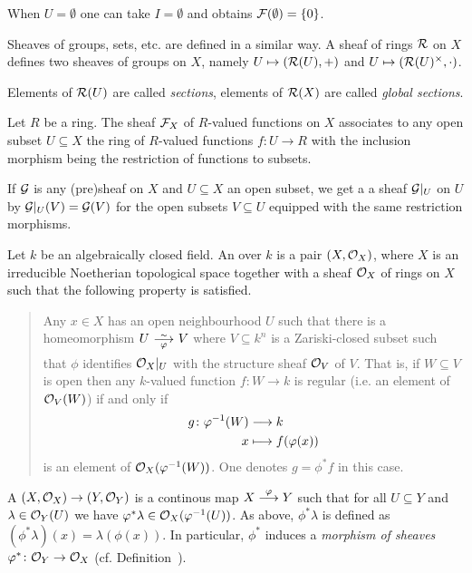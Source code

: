 \documentclass[a4paper,parskip=half,numbers=enddot, DIV=12]{scrreprt}
\begin{document}
\begin{rem}
    When $U=\emptyset$ one can take $I=\emptyset$ and obtains $\mathcal{F}(\emptyset) = \{0\}$.
\end{rem}
\begin{rem}
    Sheaves of groups, sets, etc. are defined in a similar way. A sheaf of rings $\mathcal{R}$ on $X$ defines two sheaves of groups on $X$, namely $U\mapsto (\mathcal{R}(U), +)$ and $U\mapsto (\mathcal{R}(U)^\times, \cdot)$.
\end{rem}
\begin{rem}
    Elements of $\mathcal{R}(U)$ are called \emph{sections}, elements of $\mathcal{R}(X)$ are called \emph{global sections}.
\end{rem}
\begin{example}
	    Let $R$ be a ring. The sheaf $\mathcal{F}_X$ of $R$-valued functions on $X$ associates to any open subset $U\subseteq X$ the ring of $R$-valued functions $f\colon U \to R$ with the inclusion morphism being the restriction of functions to subsets.
\end{example}
\begin{rem*}
	  If $\mathcal{G}$ is any (pre)sheaf on $X$ and $U\subseteq X$ an open subset, we get a a sheaf $\mathcal{G}|_U$ on $U$ by $\mathcal{G}|_U(V) = \mathcal{G}(V)$ for the open subsets $V\subseteq U$ equipped with the same restriction morphisms.
\end{rem*}
\begin{defi} 
	    Let $k$ be an algebraically closed field. An  over $k$ is a pair $(X,\mathcal{O}_X)$, where $X$ is an irreducible Noetherian topological space together with a sheaf $\mathcal{O}_X$ of rings on $X$ such that the following property is satisfied.
	    \begin{quote}
	        Any $x\in X$ has an open neighbourhood $U$ such that there is a homeomorphism $U\isomorphism[\phi] V$ where $V\subseteq k^n$ is a Zariski-closed subset such that $\phi$ identifies $\mathcal{O}_X|_U$ with the structure sheaf $\mathcal{O}_V$ of $V$. That is, if $W \subseteq V$ is open then any $k$-valued function $f\colon W\to k$ is regular (i.e. an element of $\mathcal{O}_V(W)$) if and only if 
	        \begin{align*}
	            g\colon \varphi^{-1}(W) &\longrightarrow k\\
	            x&\longmapsto f(\varphi(x))
	        \end{align*}
	        is an element of $\mathcal{O}_X(\varphi^{-1}(W))$. One denotes $g=\phi^*f$ in this case.
	    \end{quote}
	    A  $(X,\mathcal{O}_X) \to (Y,\mathcal{O}_Y)$ is a continous map $X\morphism[\phi] Y$ such that for all $U\subseteq Y$ and $\lambda \in \mathcal{O}_Y(U)$ we have $\varphi^\ast \lambda \in \mathcal{O}_X(\varphi^{-1}(U))$. As above, $\phi^\ast\lambda$ is defined as $(\phi^\ast\lambda)(x) = \lambda(\phi(x))$. In particular, $\phi^*$ induces a \emph{morphism of sheaves} $\varphi^*\colon \mathcal{O}_Y\to\mathcal{O}_X$ (cf. Definition~).
	\end{defi}
\end{document}
